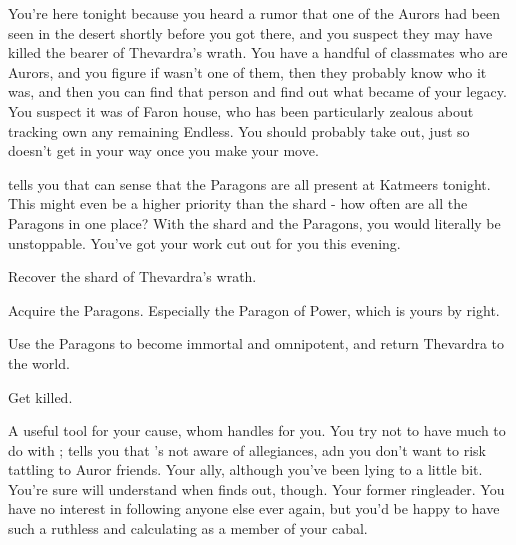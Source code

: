 \documentclass[char]{Katmeers}
\begin{document}
You're here tonight because you heard a rumor that one of the Aurors had been seen in the desert shortly before you got there, and you suspect they may have killed the bearer of Thevardra's wrath. You have a handful of classmates who are Aurors, and you figure if wasn't one of them, then they probably know who it was, and then you can find that person and find out what became of your legacy. You suspect it was \cNeville{} of Faron house, who has been particularly zealous about tracking own any remaining Endless. You should probably take \cNeville{\them} out, just so \cNeville{\they} doesn't get in your way once you make your move.

\cCrabbe{} tells you that \cCrabbe{\they} can sense that the Paragons are all present at Katmeers tonight. This might even be a higher priority than the shard - how often are all the Paragons in one place? With the shard and the Paragons, you would literally be unstoppable. You've got your work cut out for you this evening.

\begin{itemz}[Goals]
	\item Recover the shard of Thevardra's wrath.
	\item Acquire the Paragons. Especially the Paragon of Power, which is yours by right.
	\item Use the Paragons to become immortal and omnipotent, and return Thevardra to the world.
	\item Get \cNeville{} killed.
\end{itemz}

\begin{itemz}[Notes]
	\item 
\end{itemz}

\begin{contacts}
	\contact{\cGinny{}} A useful tool for your cause, whom \cCrabbe{} handles for you. You try not to have much to do with \cGinny{\them}; \cCrabbe{} tells you that \cGinny{\they}'s not aware of \cCrabbe{\their} allegiances, adn you don't want to risk \cGinny{\them} tattling to \cGinny{\their} Auror friends.
	\contact{\cCrabbe{}} Your ally, although you've been lying to \cCrabbe{\them} a little bit. You're sure \cCrabbe{\they} will understand when \cCrabbe{\they} finds out, though.
	\contact{\cMalfoy{}} Your former ringleader. You have no interest in following anyone else ever again, but you'd be happy to have such a ruthless and calculating \cMalfoy{\human} as a member of your cabal. 
\end{contacts}
\end{document}
